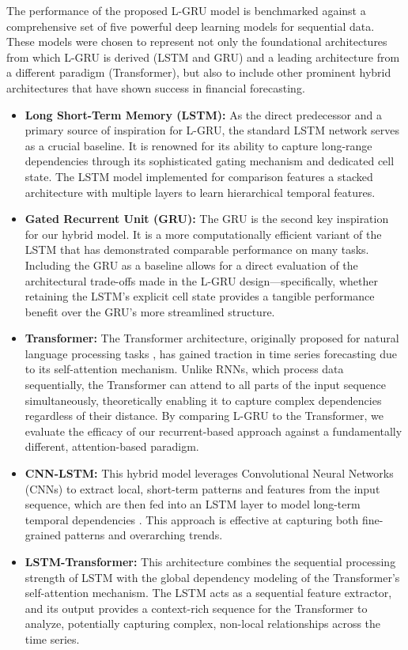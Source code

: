 \documentclass{cys}
\begin{document}
\begin{enumerate}
    The performance of the proposed L-GRU model is benchmarked against a comprehensive set of five powerful deep learning models for sequential data. These models were chosen to represent not only the foundational architectures from which L-GRU is derived (LSTM and GRU) and a leading architecture from a different paradigm (Transformer), but also to include other prominent hybrid architectures that have shown success in financial forecasting.
    
    \begin{itemize}
        \item \textbf{Long Short-Term Memory (LSTM):}
        As the direct predecessor and a primary source of inspiration for L-GRU, the standard LSTM network \cite{hochreiter1997long} serves as a crucial baseline. It is renowned for its ability to capture long-range dependencies through its sophisticated gating mechanism and dedicated cell state. The LSTM model implemented for comparison features a stacked architecture with multiple layers to learn hierarchical temporal features.
        \item \textbf{Gated Recurrent Unit (GRU):}
        The GRU \cite{cho2014learning} is the second key inspiration for our hybrid model. It is a more computationally efficient variant of the LSTM that has demonstrated comparable performance on many tasks. Including the GRU as a baseline allows for a direct evaluation of the architectural trade-offs made in the L-GRU design—specifically, whether retaining the LSTM's explicit cell state provides a tangible performance benefit over the GRU's more streamlined structure.
        \item \textbf{Transformer:}
        The Transformer architecture, originally proposed for natural language processing tasks \cite{vaswani2017attention}, has gained traction in time series forecasting due to its self-attention mechanism. Unlike RNNs, which process data sequentially, the Transformer can attend to all parts of the input sequence simultaneously, theoretically enabling it to capture complex dependencies regardless of their distance. By comparing L-GRU to the Transformer, we evaluate the efficacy of our recurrent-based approach against a fundamentally different, attention-based paradigm.
        \item \textbf{CNN-LSTM:}
        This hybrid model leverages Convolutional Neural Networks (CNNs) to extract local, short-term patterns and features from the input sequence, which are then fed into an LSTM layer to model long-term temporal dependencies \cite{hoseinzade2019cnn}. This approach is effective at capturing both fine-grained patterns and overarching trends.
        \item \textbf{LSTM-Transformer:}
        This architecture combines the sequential processing strength of LSTM with the global dependency modeling of the Transformer's self-attention mechanism. The LSTM acts as a sequential feature extractor, and its output provides a context-rich sequence for the Transformer to analyze, potentially capturing complex, non-local relationships across the time series.
    \end{itemize}


\end{enumerate}
\end{document}
